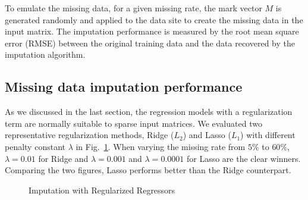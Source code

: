 To emulate the missing data, for a given missing rate, the mark vector $M$ is generated randomly and applied to the data site to create the 
missing data in the input matrix. The imputation performance is measured by the root mean square error (RMSE) between the original training data and the data recovered by the imputation algorithm. 


\subsection{Missing data imputation performance}
\label{subsec:im}
As we discussed in the last section, the regression models with a regularization term are normally suitable to sparse input matrices.
We evaluated two representative regularization methods, Ridge ($L_2$) and Lasso ($L_1$) with different penalty constant $\lambda$ in Fig.~\ref{fig:rmse:regu}.
When varying the missing rate from $5\%$ to $60\%$, $\lambda = 0.01$ for Ridge and $\lambda = 0.001$ and $\lambda = 0.0001$ for Lasso are the clear 
winners. Comparing the two figures, Lasso performs better than the Ridge counterpart.

  \begin{figure}[!ht]
    \hfill
    \caption{Imputation with Regularized Regressors}
    \label{fig:rmse:regu}
  \end{figure}

